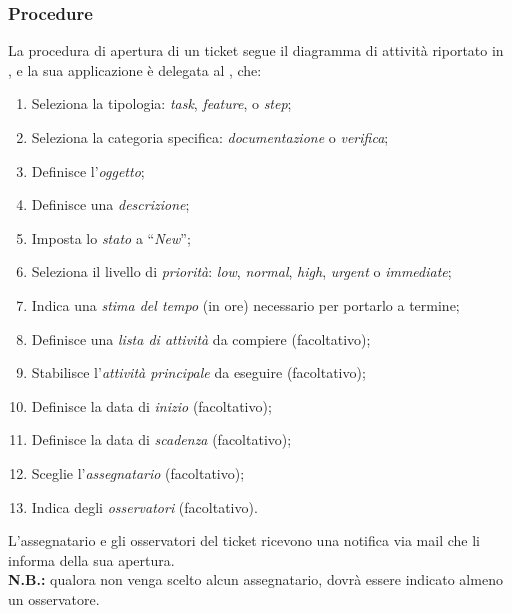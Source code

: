 \subsubsection{Procedure}\label{procedureGestione}
La procedura di apertura di un ticket segue il diagramma di attività riportato in , e la sua applicazione è delegata al \rRP, che:
\begin{enumerate}
\item Seleziona la tipologia: \emph{task}, \emph{feature}, \emph{} o \emph{step};
\item Seleziona la categoria specifica: \emph{documentazione} o \emph{verifica};
\item Definisce l'\emph{oggetto};
\item Definisce una \emph{descrizione};
\item Imposta lo \emph{stato} a ``\emph{New}'';
\item Seleziona il livello di \emph{priorità}: \emph{low}, \emph{normal}, \emph{high}, \emph{urgent} o \emph{immediate};
\item Indica una \emph{stima del tempo} (in ore) necessario per portarlo a termine;
\item Definisce una \emph{lista di attività} da compiere (facoltativo);
\item Stabilisce l'\emph{attività principale} da eseguire (facoltativo);
\item Definisce la data di \emph{inizio} (facoltativo);
\item Definisce la data di \emph{scadenza} (facoltativo);
\item Sceglie l'\emph{assegnatario} (facoltativo);
\item Indica degli \emph{osservatori} (facoltativo).
\end{enumerate}
L'assegnatario e gli osservatori del ticket ricevono una notifica via mail che li informa della sua apertura.
\\\textbf{N.B.:} qualora non venga scelto alcun assegnatario, dovrà essere indicato almeno un osservatore.

